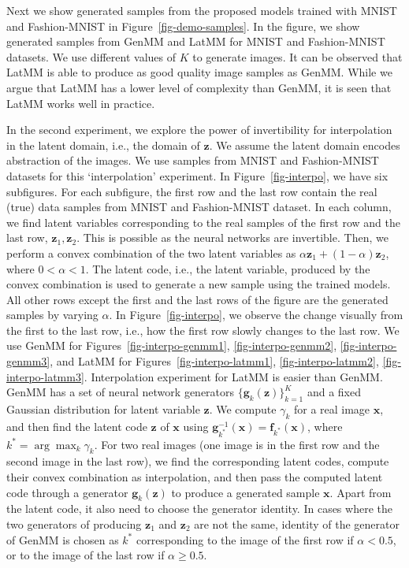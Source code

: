 Next we show generated samples from the proposed models trained with MNIST and Fashion-MNIST in Figure~\ref{fig-demo-samples}. In the figure, we show generated samples from GenMM and LatMM for MNIST and Fashion-MNIST datasets. We use different values of $K$ to generate images. It can be observed that LatMM is able to produce as good quality image samples as GenMM. While we argue that LatMM has a lower level of complexity than GenMM, it is seen that LatMM works well in practice.    

In the second experiment, we explore the power of invertibility for interpolation in the latent domain, i.e., the domain of $\bm{z}$. We assume the latent domain encodes abstraction of the images. We use samples from MNIST and Fashion-MNIST datasets for this `interpolation' experiment. In Figure~\ref{fig-interpo}, we have six subfigures. For each subfigure, the first row and the last row contain the real (true) data samples from MNIST and Fashion-MNIST dataset. In each column, we find latent variables corresponding to the real samples of the first row and the last row, $\bm{z}_1, \bm{z}_2$. This is possible as the neural networks are invertible. Then, we perform a convex combination of the two latent variables as $\alpha \bm{z}_1 + (1- \alpha)\bm{z}_2$, where $0 < \alpha <1$. The latent code, i.e., the latent variable, produced by the convex combination is used to generate a new sample using the trained models. All other rows except the first and the last rows of the figure are the generated samples by varying $\alpha$. In Figure~\ref{fig-interpo}, we observe the change visually from the first to the last row, i.e., how the first row slowly changes to the last row. We use GenMM for Figures~\ref{fig-interpo-genmm1}, \ref{fig-interpo-genmm2}, \ref{fig-interpo-genmm3}, and LatMM for Figures~\ref{fig-interpo-latmm1}, \ref{fig-interpo-latmm2}, \ref{fig-interpo-latmm3}. Interpolation experiment for LatMM is easier than GenMM. GenMM has a set of neural network generators $\{ \bm{g}_k(\bm{z}) \}_{k=1}^K$ and a fixed Gaussian distribution for latent variable $\bm{z}$. We compute $\gamma_k$ for a real image $\bm{x}$, and then find the latent code $\bm{z}$ of $\bm{x}$ using $\bm{g}_{k^{*}}^{-1}(\bm{x})=\bm{f}_{k^{*}}(\bm{x})$, where $k^{*} = \arg \max_{k} \gamma_k$. For two real images (one image is in the first row and the second image in the last row), we find the corresponding latent codes, compute their convex combination as interpolation, and then pass the computed latent code through a generator $\bm{g}_k(\bm{z})$ to produce a generated sample $\bm{x}$. Apart from the latent code, it also need to choose the generator identity. In cases where the two generators of producing $\bm{z}_1$ and $\bm{z}_2$ are not the same, identity of the generator of GenMM is chosen as $k^{*}$ corresponding to the image of the first row if $\alpha < 0.5$, or to the image of the last row if $\alpha \geq 0.5$.

